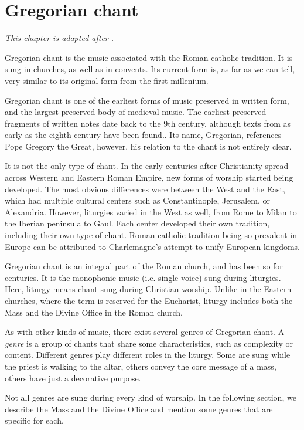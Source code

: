 \chapter{Gregorian chant}

\emph{This chapter is adapted after \cite{chant_book}.}

Gregorian chant is the music associated with the Roman catholic tradition. It is sung in churches, as well as in convents. Its current form is,
as far as we can tell, very similar to its original form from the first millenium.

Gregorian chant is one of the earliest forms of music preserved in written form, and the
largest preserved body of medieval music. The earliest preserved fragments of written notes date back to the 9th century, although texts from as early as 
the eighth century have been found.. Its name, Gregorian, references Pope Gregory the Great, however, his relation to the chant is not entirely clear.

It is not the only type of chant. In the early centuries after Christianity spread across Western and Eastern Roman Empire,
new forms of worship started being developed. The most obvious differences were between the West and the East, which had multiple cultural
centers such as Constantinople, Jerusalem, or Alexandria. However, liturgies varied in the West as well, from Rome to Milan to the Iberian peninsula to Gaul.
Each center developed their own tradition, including their own type of chant. Roman-catholic tradition being so prevalent in Europe
can be attributed to Charlemagne's attempt to unify European kingdoms.

Gregorian chant is an integral part of the Roman church, and has been so for centuries. It is the monophonic music (i.e. single-voice)
sung during liturgies. Here, liturgy means chant sung during Christian worship. Unlike in the Eastern churches, where the term is reserved 
for the Eucharist, liturgy includes both the Mass and the Divine Office in the Roman church.

As with other kinds of music, there exist several genres of Gregorian chant. A \emph{genre} is a group of chants that share some characteristics, such as
complexity or content. Different genres play different roles in the liturgy. Some are sung while the priest is walking to the altar, others convey the
core message of a mass, others have just a decorative purpose.

Not all genres are sung during every kind of worship. In the following section, we describe the Mass and the Divine Office and mention some genres
that are specific for each.

